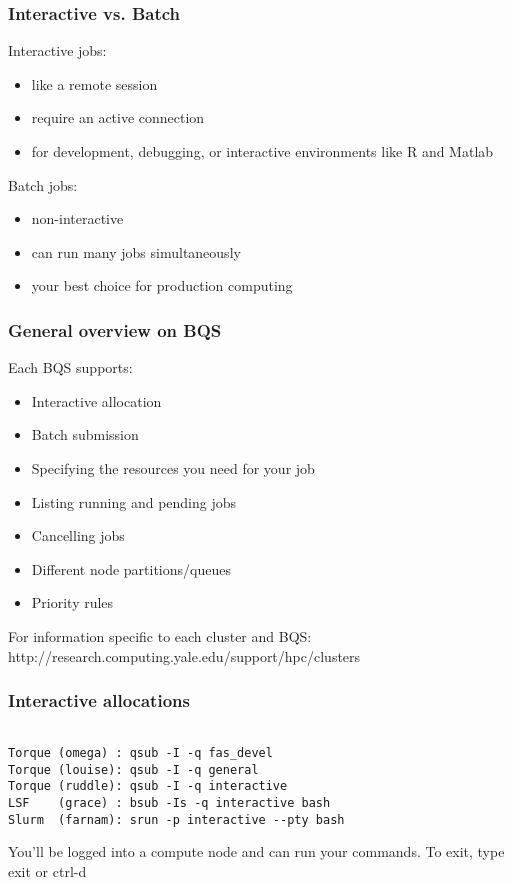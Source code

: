 \documentclass[10pt]{beamer}
\begin{document}
\begin{frame}[fragile]
\frametitle{Interactive vs. Batch}

Interactive jobs:
\begin{itemize}
\item like a remote session
\item require an active connection
\item for development, debugging, or 
interactive environments like R and Matlab 
\end{itemize}
\vskip10pt

Batch jobs:
\begin{itemize}
\item non-interactive  
\item can run many jobs simultaneously
\item your best choice for production computing
\end{itemize}
\end{frame}

\begin{frame}[fragile]
\frametitle{General overview on BQS}

Each BQS supports:
\begin{itemize}
\item Interactive allocation
\item Batch submission
\item Specifying the resources you need for your job
\item Listing running and pending jobs
\item Cancelling jobs
\item Different node partitions/queues
\item Priority rules
\end{itemize}

For information specific to each cluster and BQS:
http://research.computing.yale.edu/support/hpc/clusters

\end{frame}

\begin{frame}[fragile]
\frametitle{Interactive allocations}

\begin{verbatim}

Torque (omega) : qsub -I -q fas_devel
Torque (louise): qsub -I -q general 
Torque (ruddle): qsub -I -q interactive
LSF    (grace) : bsub -Is -q interactive bash
Slurm  (farnam): srun -p interactive --pty bash

\end{verbatim}

You'll be logged into a compute node and can run your commands. 
\vspace{0.1in}
To exit, type exit or ctrl-d

\end{frame}
\end{document}
